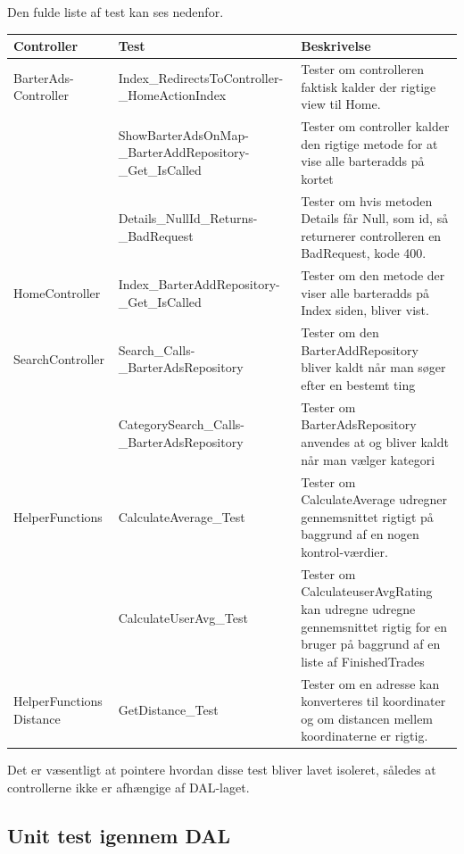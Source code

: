 Den fulde liste af test kan ses nedenfor.
\setlength{\arrayrulewidth}{0.3mm}
\setlength{\tabcolsep}{2pt}
\renewcommand{\arraystretch}{1.5}
\begin{table}[H]
	\begin{tabular}{ | p{3.0cm} | p{5.5cm} | p{8.0cm} | }
		\hline
		\textbf{Controller} & \textbf{Test} & \textbf{Beskrivelse} \\
		\hline
		BarterAds-Controller &  Index\_RedirectsToController-\_HomeActionIndex & Tester om controlleren faktisk kalder der rigtige view til Home. \\
		
		& ShowBarterAdsOnMap-\_BarterAddRepository-\_Get\_IsCalled & Tester om controller kalder den rigtige metode for at vise alle barteradds på kortet\\
	
		& Details\_NullId\_Returns-\_BadRequest & Tester om hvis metoden Details får Null, som id, så returnerer controlleren en BadRequest, kode 400. \\
		\hline
		HomeController & Index\_BarterAddRepository-\_Get\_IsCalled & Tester om den metode der viser alle barteradds på Index siden, bliver vist. \\
		\hline
		SearchController & Search\_Calls-\_BarterAdsRepository & Tester om den BarterAddRepository bliver kaldt når man søger efter en bestemt ting \\
		& CategorySearch\_Calls-\_BarterAdsRepository & Tester om BarterAdsRepository anvendes at og bliver kaldt når man vælger kategori \\
		\hline
		HelperFunctions & CalculateAverage\_Test & Tester om CalculateAverage udregner gennemsnittet rigtigt på baggrund af en nogen kontrol-værdier. \\ &  CalculateUserAvg\_Test & Tester om CalculateuserAvgRating kan udregne udregne gennemsnittet rigtig for en bruger på baggrund af en liste af FinishedTrades\\
		\hline
		HelperFunctions Distance & GetDistance_Test & Tester om en adresse kan konverteres til koordinater og om distancen mellem koordinaterne er rigtig.\\
		\hline
	\end{tabular}
\end{table}

Det er væsentligt at pointere hvordan disse test bliver lavet isoleret, således at controllerne ikke er afhængige af DAL-laget.

\subsection{Unit test igennem DAL}

